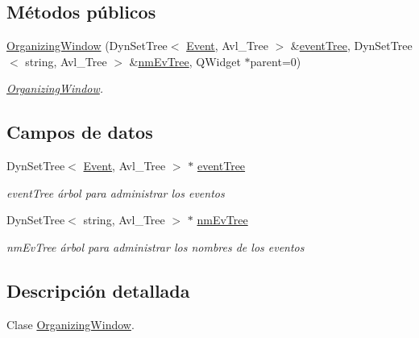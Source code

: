 \subsection*{Métodos públicos}
\begin{DoxyCompactItemize}
\item 
\hyperlink{class_organizing_window_a26d627dc9556ccc133f72c1039eb5942}{Organizing\+Window} (Dyn\+Set\+Tree$<$ \hyperlink{class_event}{Event}, Avl\+\_\+\+Tree $>$ \&\hyperlink{class_organizing_window_a2658600a27160da36da9a20584300aac}{event\+Tree}, Dyn\+Set\+Tree$<$ string, Avl\+\_\+\+Tree $>$ \&\hyperlink{class_organizing_window_ada5d0fdbd1c783d2350a3f6d939e646b}{nm\+Ev\+Tree}, Q\+Widget $\ast$parent=0)
\begin{DoxyCompactList}\small\item\em \hyperlink{class_organizing_window}{Organizing\+Window}. \end{DoxyCompactList}\end{DoxyCompactItemize}
\subsection*{Campos de datos}
\begin{DoxyCompactItemize}
\item 
Dyn\+Set\+Tree$<$ \hyperlink{class_event}{Event}, Avl\+\_\+\+Tree $>$ $\ast$ \hyperlink{class_organizing_window_a2658600a27160da36da9a20584300aac}{event\+Tree}\hypertarget{class_organizing_window_a2658600a27160da36da9a20584300aac}{}\label{class_organizing_window_a2658600a27160da36da9a20584300aac}

\begin{DoxyCompactList}\small\item\em event\+Tree árbol para administrar los eventos \end{DoxyCompactList}\item 
Dyn\+Set\+Tree$<$ string, Avl\+\_\+\+Tree $>$ $\ast$ \hyperlink{class_organizing_window_ada5d0fdbd1c783d2350a3f6d939e646b}{nm\+Ev\+Tree}\hypertarget{class_organizing_window_ada5d0fdbd1c783d2350a3f6d939e646b}{}\label{class_organizing_window_ada5d0fdbd1c783d2350a3f6d939e646b}

\begin{DoxyCompactList}\small\item\em nm\+Ev\+Tree árbol para administrar los nombres de los eventos \end{DoxyCompactList}\end{DoxyCompactItemize}


\subsection{Descripción detallada}
Clase \hyperlink{class_organizing_window}{Organizing\+Window}. 

